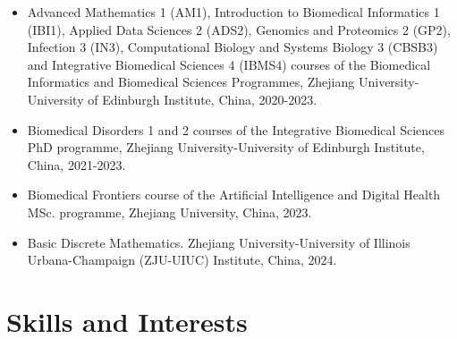 \documentclass[11pt,a4paper,sans]{moderncv} %
\begin{document}
\begin{itemize}
  \item Advanced Mathematics 1 (AM1), Introduction to Biomedical Informatics 1 (IBI1), Applied Data Sciences 2 (ADS2), Genomics and Proteomics 2 (GP2), Infection 3 (IN3), Computational Biology and Systems Biology 3 (CBSB3) and Integrative Biomedical Sciences 4 (IBMS4) courses of the Biomedical Informatics and Biomedical Sciences Programmes, Zhejiang University-University of Edinburgh Institute, China, 2020-2023.
  \item Biomedical Disorders 1 and 2 courses of the Integrative Biomedical Sciences PhD programme, Zhejiang University-University of Edinburgh Institute, China, 2021-2023.
  \item Biomedical Frontiers course of the Artificial Intelligence and Digital Health MSc. programme, Zhejiang University, China, 2023.
  \item Basic Discrete Mathematics. Zhejiang University-University of Illinois Urbana-Champaign (ZJU-UIUC) Institute, China, 2024.
\end{itemize}



\vspace{0.5cm}

\section{Skills and Interests}
\end{document}
